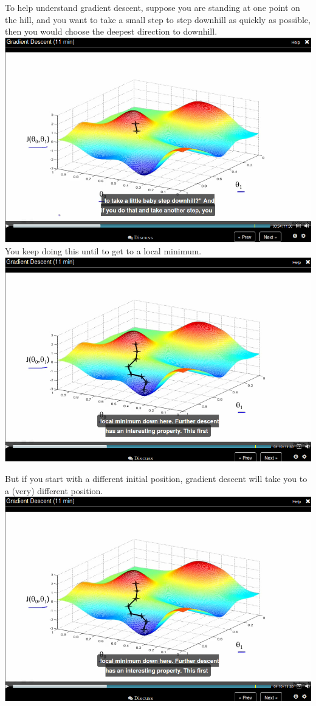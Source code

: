 \documentclass[11pt]{article}
\begin{document}
To help understand gradient descent, suppose you are standing at one point on the hill, and you want to take a small step to step downhill as quickly as possible, then you would choose the deepest direction to downhill.
\includegraphics[width=.9\linewidth]{./images/screenshot-07.png}
You keep doing this until to get to a local minimum.
\includegraphics[width=.9\linewidth]{./images/screenshot-08.png}

But if you start with a different initial position, gradient descent will take you to a (very) different position.
\includegraphics[width=.9\linewidth]{./images/screenshot-08.png}
\end{document}
